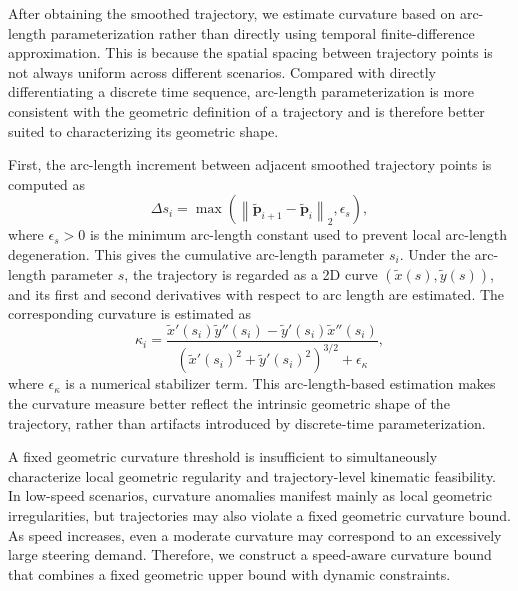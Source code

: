 \documentclass[3p,times,authoryear]{elsarticle}
\newcommand{\pt}{\mathbf{p}}
\begin{document}
After obtaining the smoothed trajectory, we estimate curvature based on arc-length parameterization rather than directly using temporal finite-difference approximation. This is because the spatial spacing between trajectory points is not always uniform across different scenarios. Compared with directly differentiating a discrete time sequence, arc-length parameterization is more consistent with the geometric definition of a trajectory and is therefore better suited to characterizing its geometric shape.

First, the arc-length increment between adjacent smoothed trajectory points is computed as
\begin{equation}
    \Delta s_i = \max\!\left(\left\|\tilde{\pt}_{i+1}-\tilde{\pt}_i\right\|_2,\epsilon_s\right),
\end{equation}
where $\epsilon_s > 0$ is the minimum arc-length constant used to prevent local arc-length degeneration. This gives the cumulative arc-length parameter $s_i$. Under the arc-length parameter $s$, the trajectory is regarded as a 2D curve $(\tilde{x}(s), \tilde{y}(s))$, and its first and second derivatives with respect to arc length are estimated. The corresponding curvature is estimated as
\begin{equation}
    \kappa_i =
    \frac{\tilde{x}'(s_i)\tilde{y}''(s_i)-\tilde{y}'(s_i)\tilde{x}''(s_i)}
    {\left(\tilde{x}'(s_i)^2+\tilde{y}'(s_i)^2\right)^{3/2}+\epsilon_{\kappa}},
\end{equation}
where $\epsilon_{\kappa}$ is a numerical stabilizer term. This arc-length-based estimation makes the curvature measure better reflect the intrinsic geometric shape of the trajectory, rather than artifacts introduced by discrete-time parameterization.

A fixed geometric curvature threshold is insufficient to simultaneously characterize local geometric regularity and trajectory-level kinematic feasibility. In low-speed scenarios, curvature anomalies manifest mainly as local geometric irregularities, but trajectories may also violate a fixed geometric curvature bound. As speed increases, even a moderate curvature may correspond to an excessively large steering demand. Therefore, we construct a speed-aware curvature bound that combines a fixed geometric upper bound with dynamic constraints.
\end{document}
